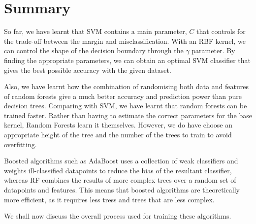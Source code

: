 \newpage
\section{Summary}
So far, we have learnt that SVM contains a main parameter, $C$ that controls for the trade-off between the margin and misclassification. With an RBF kernel, we can control the shape of the decision boundary through the $\gamma$ parameter. By finding the appropriate parameters, we can obtain an optimal SVM classifier that gives the best possible accuracy with the given dataset.

Also, we have learnt how the combination of randomising both data and features of random forests give a much better accuracy and prediction power than pure decision trees. Comparing with SVM, we have learnt that random forests can be trained faster. Rather than having to estimate the correct parameters for the base kernel, Random Forests learn it themselves. However, we do have choose an appropriate height of the tree and the number of the trees to train to avoid overfitting.

Boosted algorithms such as AdaBoost uses a collection of weak classifiers and weights ill-classified datapoints to reduce the bias of the resultant classifier, whereas RF combines the results of more complex trees over a random set of datapoints and features. This means that boosted algorithms are theoretically more efficient, as it requires less tress and trees that are less complex.

We shall now discuss the overall process used for training these algorithms.
